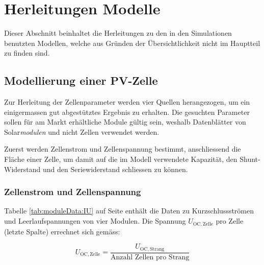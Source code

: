 \chapter{Herleitungen Modelle}
\label{app:models:develop}

Dieser  Abschnitt  beinhaltet die  Herleitungen  zu  den in  den  Simulationen
benutzten  Modellen, welche  aus  Gr\"unden der  \"Ubersichtlichkeit nicht  im
Hauptteil zu finden sind.

\section{Modellierung einer PV-Zelle}
\label{app:models:develop:cell}

Zur  Herleitung  der  Zellenparameter  werden vier  Quellen  herangezogen,  um
ein  einigermassen  gut  abgest\"utztes Ergebnis  zu  erhalten. Die  gesuchten
Parameter sollen  f\"ur am Markt  erh\"altliche Module g\"ultig  sein, weshalb
Datenbl\"atter von Solar\emph{modulen} und nicht Zellen verwendet werden.

Zuerst  werden  Zellenstrom  und Zellenspannung  bestimmt,  anschliessend  die
Fl\"ache einer Zelle,  um damit auf die im Modell  verwendete Kapazit\"at, den
Shunt-Widerstand und den Seriewiderstand schliessen zu k\"onnen.


\subsection{Zellenstrom und Zellenspannung}
\label{app:subsec:cell:UI}

Tabelle   \ref{tab:moduleData:IU}    auf   Seite   \pageref{tab:moduleData:IU}
enth\"alt die  Daten zu  Kurzschlussstr\"omen und Leerlaufspannungen  von vier
Modulen. Die  Spannung  $U_{\mathrm{OC,  Zelle}}$ pro  Zelle  (letzte  Spalte)
errechnet sich gem\"ass:

\begin{equation}
    \label{eq:voltagePerCell}
    U_{\mathrm{OC, Zelle}} = \frac{U_{\mathrm{OC, Strang}}}{\text{Anzahl Zellen pro Strang}}
\end{equation}

